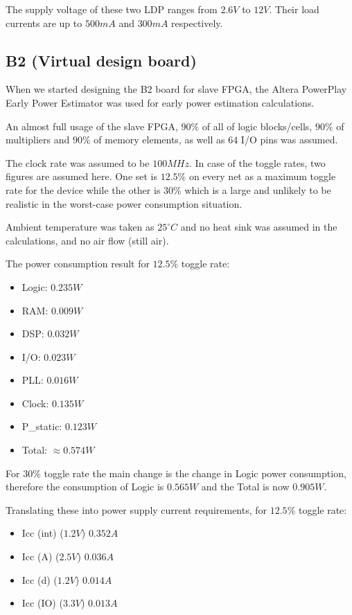 The supply voltage of these two LDP ranges from $2.6V$ to $12V$. Their load currents are up to $500mA$ and $300mA$ respectively.


\newpage
\subsection{B2 (Virtual design board)}

When we started designing the B2 board for slave FPGA, the Altera PowerPlay Early Power Estimator was
used for early power estimation calculations.

An almost full usage of the slave FPGA, $90\%$ of all of logic blocks/cells,
$90\%$ of multipliers and $90\%$ of memory elements, as well as $64$ I/O pins was assumed.

The clock rate was assumed to be $100MHz$. In case of the toggle rates, two figures are assumed here.
One set is $12.5\%$ on every net as a maximum toggle rate for the device while the
other is $30\%$ which is a large and unlikely to be realistic in the worst-case power consumption situation.

Ambient temperature was taken as $25^{\circ} C$ and no heat sink was assumed in the calculations, and no air flow (still air).

The power consumption result for $12.5\%$ toggle rate:
\begin{itemize}
 \item Logic: $0.235 W$
 \item RAM: $0.009 W$
 \item DSP: $0.032W$
 \item I/O: $0.023 W$
 \item PLL: $0.016 W$
 \item Clock: $0.135W$
 \item P\_static: $0.123W$
 \item Total: $\approx0.574 W$
\end{itemize}
For $30\%$ toggle rate the main change is the change in Logic power consumption, therefore the consumption of Logic is $0.565 W$ and the Total is now $0.905 W$.

Translating these into power supply current requirements, for $12.5\%$ toggle rate:
\begin{itemize}
 \item Icc (int) ($1.2V$) $0.352A$
 \item Icc (A) ($2.5V$) $0.036A$
 \item Icc (d) ($1.2V$) $0.014A$
 \item Icc (IO) ($3.3V$) $0.013A$
\end{itemize}

